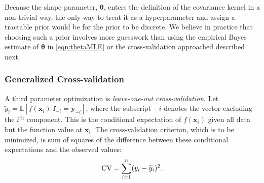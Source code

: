 \documentclass[twocolumn]{svjour3}          %
\newcommand{\bm}[1]{\boldsymbol{#1}}
\newcommand{\Ex}{\mathbb{E}}
\newcommand{\vtheta}{{\bm{\theta}}}
\newcommand{\vf}{\bm{f}}
\newcommand{\vx}{\bm{x}}
\newcommand{\vy}{\bm{y}}
\begin{document}
Because the shape parameter, $\vtheta$, enters the definition of the covariance kernel in a non-trivial way, the only way to treat it as a hyperparameter and assign a tractable prior would be for the prior to be discrete.  We believe in practice that choosing such a prior involves more guesswork than using the empirical Bayes estimate of $\vtheta$ in \eqref{eqn:thetaMLE} or the cross-validation approached described next.


\subsubsection{Generalized Cross-validation} \label{sec:GCV}
A third parameter optimization is \emph{leave-one-out cross-validation}.  Let $\widetilde{y}_i = \Ex[f(\vx_i ) | \vf_{-i} = \vy_{-i}]$, where the subscript $-i$ denotes the vector excluding the $i^{\text{th}}$ component.  This is the conditional expectation of $f(\vx_i )$ given all data but the function value at $\vx_i$.  The cross-validation criterion, which is to be minimized, is sum of squares of the difference between these conditional expectations and the observed values:
\begin{equation} \label{FJH:eq:CVA}
\textup{CV} = \sum_{i=1}^n (y_i - \widetilde{y}_i)^2.
\end{equation}
\end{document}
